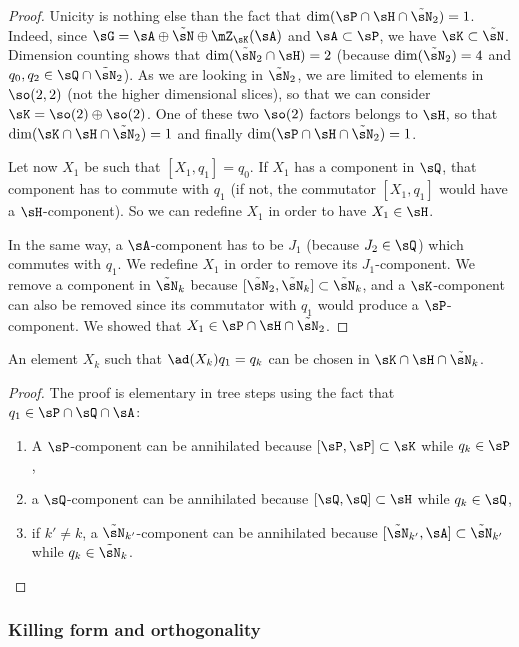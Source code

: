 \begin{proof}
	Unicity is nothing else than the fact that $\dim(\sP\cap\sH\cap\tilde\sN_2)=1$. Indeed, since $\sG=\sA\oplus\tilde\sN\oplus\mZ_{\sK}(\sA)$ and $\sA\subset\sP$, we have $\sK\subset\tilde\sN$. Dimension counting shows that $\dim(\tilde\sN_2\cap\sH)=2$ (because $\dim(\tilde\sN_2)=4$ and $q_0,q_2\in\sQ\cap\tilde\sN_2$). As we are looking in $\tilde\sN_2$, we are limited to elements in $\so(2,2)$ (not the higher dimensional slices), so that we can consider $\sK=\so(2)\oplus\so(2)$. One of these two $\so(2)$ factors belongs to $\sH$, so that $\dim(\sK\cap\sH\cap\tilde\sN_2)=1$  and finally $\dim(\sP\cap\sH\cap\tilde\sN_2)=1$.

	Let now $X_1$ be such that $[X_1,q_1]=q_0$. If $X_1$ has a component in $\sQ$, that component has to commute with $q_1$ (if not, the commutator $[X_1,q_1]$ would have a $\sH$-component). So we can redefine $X_1$ in order to have $X_1\in\sH$.

	In the same way, a $\sA$-component has to be $J_1$ (because $J_2\in\sQ$) which commutes with $q_1$. We redefine $X_1$ in order to remove its $J_1$-component. We remove a component in $\tilde\sN_k$ because $[\tilde\sN_2,\tilde\sN_k]\subset\tilde\sN_k$, and a $\sK$-component can also be removed since its commutator with $q_1$ would produce a $\sP$-component. We showed that $X_1\in\sP\cap\sH\cap\tilde\sN_2$.
\end{proof}

\begin{lemma}		\label{LONGLemChoixDeXk}
	An element $X_k$ such that $\ad(X_k)q_1=q_k$ can be chosen in $\sK\cap\sH\cap\tilde\sN_k$.
\end{lemma}

\begin{proof}
	The proof is elementary in tree steps using the fact that $q_1\in\sP\cap\sQ\cap\sA$:
	\begin{enumerate}
		\item
			A $\sP$-component can be annihilated because $[\sP,\sP]\subset\sK$ while $q_k\in\sP$,
		\item
			a $\sQ$-component can be annihilated because $[\sQ,\sQ]\subset\sH$ while $q_k\in\sQ$,
		\item
			if $k'\neq k$, a $\tilde\sN_{k'}$-component can be annihilated because $[\tilde\sN_{k'},\sA]\subset\tilde\sN_{k'}$ while $q_k\in\tilde\sN_k$.
	\end{enumerate}
\end{proof}


%
\subsubsection{Killing form and orthogonality}
%




